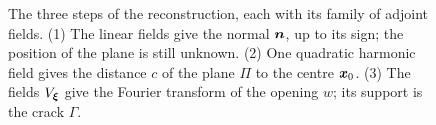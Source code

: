 \begin{figure}[h]
\caption{The three steps of the reconstruction, each with its family of
adjoint fields. (1) The linear fields give the normal $\bm{n}$, up to its sign;
the position of the plane is still unknown. (2) One quadratic harmonic field
gives the distance $c$ of the plane $\Pi$ to the centre $\bm{x}_0$. (3) The
fields $V_{\bm{\xi}}$ give the Fourier transform of the opening $w$; its support
is the crack $\Gamma$.}
\label{fig:rg-steps}
\end{figure}

